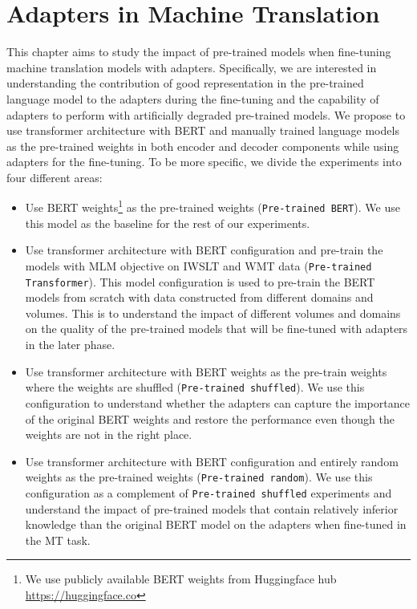 
\chapter{Adapters in Machine Translation}
\label{chap:adaptmt}
This chapter aims to study the impact of pre-trained models when fine-tuning machine translation models with adapters. Specifically, we are interested in understanding the contribution of good representation in the pre-trained language model to the adapters during the fine-tuning and the capability of adapters to perform with artificially degraded pre-trained models. We propose to use transformer architecture with BERT and manually trained language models as the pre-trained weights in both encoder and decoder components while using adapters for the fine-tuning. To be more specific, we divide the experiments into four different areas:
\begin{itemize}
    \item Use BERT weights\footnote{We use publicly available BERT weights from Huggingface hub \url{https://huggingface.co}} as the pre-trained weights (\texttt{Pre-trained BERT}). We use this model as the baseline for the rest of our experiments.
    \item Use transformer architecture with BERT configuration and pre-train the models with MLM objective on IWSLT and WMT data (\texttt{Pre-trained Transformer}). This model configuration is used to pre-train the BERT models from scratch with data constructed from different domains and volumes. This is to understand the impact of different volumes and domains on the quality of the pre-trained models that will be fine-tuned with adapters in the later phase.
    \item Use transformer architecture with BERT weights as the pre-train weights where the weights are shuffled (\texttt{Pre-trained shuffled}). We use this configuration to understand whether the adapters can capture the importance of the original BERT weights and restore the performance even though the weights are not in the right place.
    \item Use transformer architecture with BERT configuration and entirely random weights as the pre-trained weights (\texttt{Pre-trained random}). We use this configuration as a complement of \texttt{Pre-trained shuffled} experiments and understand the impact of pre-trained models that contain relatively inferior knowledge than the original BERT model on the adapters when fine-tuned in the MT task.
\end{itemize}

